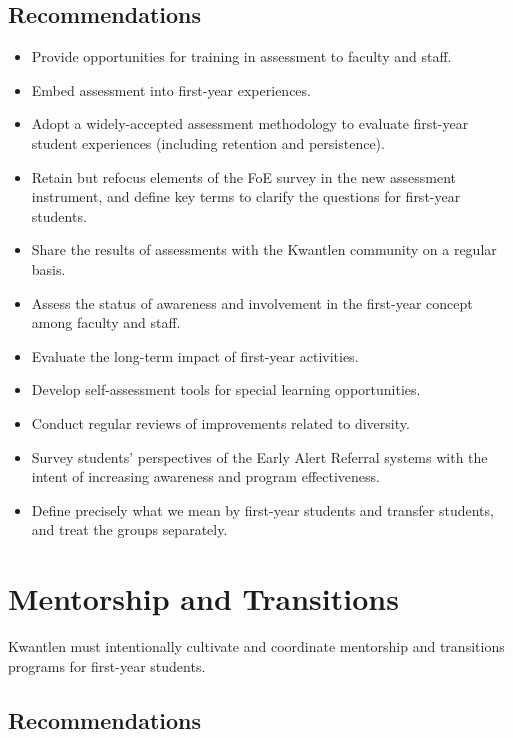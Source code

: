 \documentclass[11pt, letterpaper]{article}
\begin{document}
\subsection{Recommendations}

\begin{itemize}
\item
  Provide opportunities for training in assessment to faculty and staff.
\item
  Embed assessment into first-year experiences.
\item
  Adopt a widely-accepted assessment methodology to evaluate first-year
  student experiences (including retention and persistence).
\item
  Retain but refocus elements of the FoE survey in the new assessment
  instrument, and define key terms to clarify the questions for
  first-year students.
\item
  Share the results of assessments with the Kwantlen community on a
  regular basis.
\item
  Assess the status of awareness and involvement in the first-year
  concept among faculty and staff.
\item
  Evaluate the long-term impact of first-year activities.
\item
  Develop self-assessment tools for special learning opportunities.
\item
  Conduct regular reviews of improvements related to diversity.
\item
  Survey students' perspectives of the Early Alert Referral systems with
  the intent of increasing awareness and program effectiveness.
\item
  Define precisely what we mean by first-year students and transfer
  students, and treat the groups separately.
\end{itemize}

\section{Mentorship and Transitions}

Kwantlen must intentionally cultivate and coordinate mentorship and transitions programs for first-year students.

\subsection{Recommendations}
\end{document}
